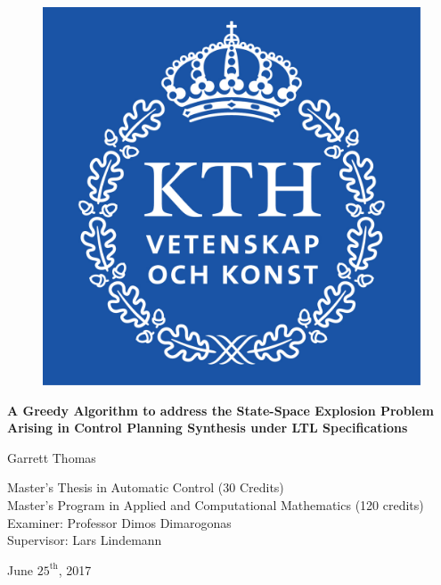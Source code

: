\begin{figure}[!htb]
\centering
\includegraphics[scale=0.4]{kth_logo}
\end{figure} 

{
\centering 

\vspace*{2\baselineskip}

\textbf{\Large A Greedy Algorithm to address the State-Space Explosion Problem Arising in Control Planning Synthesis under LTL Specifications}

\vspace*{3\baselineskip}

{\large Garrett Thomas}

\vspace*{\baselineskip}

%

{\small Master's Thesis in Automatic Control (30 Credits) \\ Master's Program in Applied and Computational Mathematics (120 credits) \\ Examiner: Professor Dimos Dimarogonas \\ Supervisor: Lars Lindemann }

\vspace*{3\baselineskip}

{June $25^{\text{th}}$, 2017}
\par
}